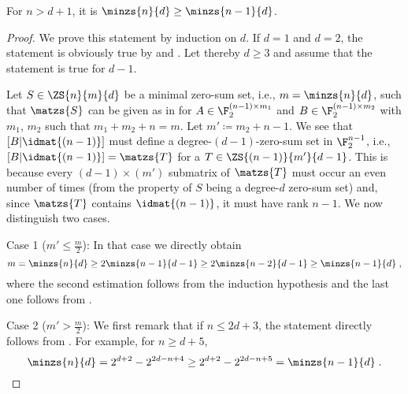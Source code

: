 \begin{proposition}
For $n > d+1$, it is $\minzs{n}{d} \geq \minzs{n-1}{d}$.
\end{proposition}
\begin{proof}
We prove this statement by induction on $d$. If $d = 1$ and $d=2$, the statement is obviously true by  and . Let thereby $d \geq 3$ and assume that the statement is true for $d-1$. 

Let $S \in \ZS{n}{m}{d}$ be a minimal zero-sum set, i.e., $m = \minzs{n}{d}$, such that $\matzs{S}$ can be given as in  for $A \in \F_2^{(n-1) \times m_1}$ and $B \in \F_2^{(n-1) \times m_2}$ with $m_1$, $m_2$ such that $m_1+m_2+n = m$. Let $m' \coloneqq m_2+n-1$. We see that $[B | \idmat{(n-1)}]$ must define a degree-$(d-1)$-zero-sum set in $\F_2^{n-1}$, i.e., $[B | \idmat{(n-1)}] = \matzs{T}$ for a $T \in \ZS{(n-1)}{m'}{d-1}$. This is because every $(d-1) \times (m')$ submatrix of $\matzs{T}$ must occur an even number of times (from the property of $S$ being a degree-$d$ zero-sum set) and, since $\matzs{T}$ contains $\idmat{(n-1)}$, it must have rank $n-1$. We now distinguish two cases.

Case 1 ($m' \leq \frac{m}{2}$): In that case we directly obtain
\[m = \minzs{n}{d} \geq 2 \minzs{n-1}{d-1} \geq 2 \minzs{n-2}{d-1} \geq \minzs{n-1}{d}\;,\]
where the second estimation follows from the induction hypothesis and the last one follows from .

Case 2 ($m' > \frac{m}{2}$): We first remark that if $n \leq 2d+3$, the statement directly follows from . For example, for $n \geq d + 5$, 
\[ \minzs{n}{d} = 2^{d+2} - 2^{2d-n+4} \geq 2^{d+2} - 2^{2d-n+5} = \minzs{n-1}{d}\;.\]


\end{proof}
